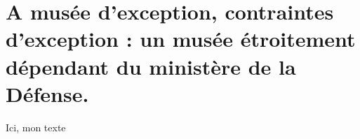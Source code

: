 \section{\label{I-B-1}A musée d’exception, contraintes d’exception : un musée étroitement dépendant du ministère de la Défense. }

Ici, mon texte